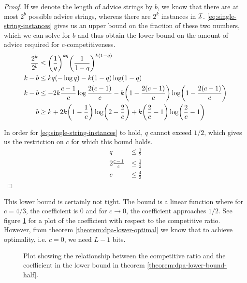 \begin{proof}
    If we denote the length of advice strings by $b$, we know that there
    are at most $2^b$ possible advice strings, whereas there are $2^k$
    instances in $\mathcal{I}$. \eqref{eq:single-string-instances} gives us an
    upper bound on the fraction of these two numbers, which we can solve
    for $b$ and thus obtain the lower bound on the amount of advice
    required for $c$-competitiveness.
    \begin{align*}
        \frac{2^k}{2^b} &\leq \paren*{\frac{1}{q}}^{kq}
            \paren*{\frac{1}{1-q}}^{k(1-q)} \\
        k-b &\leq kq(-\log{}q) - k(1-q)\log(1-q) \\
        k-b &\leq -2k\frac{c-1}{c}\log\frac{2(c-1)}{c} -
            k\paren*{1-\frac{2(c-1)}{c}} \log\paren*{1-\frac{2(c-1)}{c}} \\
        b &\geq k + 2k\paren*{1-\frac{1}{c}}\log\paren*{2-\frac{2}{c}}
            + k\paren*{\frac{2}{c}-1}\log\paren*{\frac{2}{c}-1}
    \end{align*}

    In order for \eqref{eq:single-string-instances} to hold, $q$ cannot
    exceed $1/2$, which gives us the restriction on $c$ for which this
    bound holds.
    \begin{align*}
        q &\leq \frac{1}{2} \\
        2\frac{c-1}{c} &\leq \frac{1}{2} \\
        c &\leq \frac{4}{3}
    \end{align*}
\end{proof}

This lower bound is certainly not tight. The bound is a linear function
where for $c=4/3$, the coefficient is $0$ and for $c \to 0$, the
coefficient approaches $1/2$. See figure \ref{fig:dpa-lower-half-plot} for
a plot of the coefficient with respect to the competitive ratio. However,
from theorem \ref{theorem:dpa-lower-optimal} we know that to achieve
optimality, i.e. $c = 0$, we need $L-1$ bits.

\begin{figure}\centering
    \caption{Plot showing the relationship between the competitive ratio
    and the coefficient in the lower bound in theorem
    \ref{theorem:dpa-lower-bound-half}.}
    \label{fig:dpa-lower-half-plot}
\end{figure}

